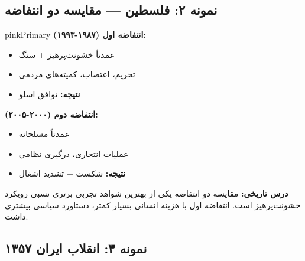 \documentclass[a4paper,12pt]{article}
\begin{document}
\subsection{نمونه ۲: فلسطین — مقایسه دو انتفاضه}

\begin{methodcard}{pinkPrimary}
\textbf{انتفاضه اول (۱۹۸۷-۱۹۹۳):}
\begin{itemize}
  \item عمدتاً خشونت‌پرهیز + سنگ
  \item تحریم، اعتصاب، کمیته‌های مردمی
  \item \textbf{نتیجه:} توافق اسلو \textcolor{yellowPrimary}{\faExclamationTriangle}
\end{itemize}

\vspace{6pt}
\textbf{انتفاضه دوم (۲۰۰۰-۲۰۰۵):}
\begin{itemize}
  \item عمدتاً مسلحانه
  \item عملیات انتحاری، درگیری نظامی
  \item \textbf{نتیجه:} شکست + تشدید اشغال \textcolor{redPrimary}{\faTimesCircle}
\end{itemize}

\vspace{6pt}
\begin{notebox}[yellowPrimary]
\textcolor{yellowPrimary}{\textbf{درس تاریخی:}} مقایسه دو انتفاضه یکی از بهترین شواهد تجربی برتری نسبی رویکرد خشونت‌پرهیز است. انتفاضه اول با هزینه انسانی بسیار کمتر، دستاورد سیاسی بیشتری داشت.
\end{notebox}
\end{methodcard}


\subsection{نمونه ۳: انقلاب ایران ۱۳۵۷}
\end{document}
